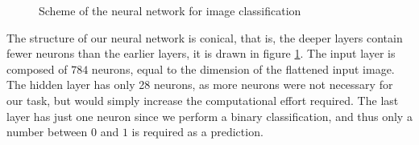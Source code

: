 \documentclass[a4paper,11pt,oneside]{book}
\def\nstyle{int(\lay<\Nnodlen?min(2,\lay):3)} %
\begin{document}
\begin{figure}
\centering
{}
\caption{Scheme of the neural network for image classification}
\label{NN_scheme}
\end{figure}


The structure of our neural network is conical, that is, the deeper layers contain fewer neurons than the earlier layers, it is drawn in figure \ref{NN_scheme}. 
The input layer is composed of $784$ neurons, equal to the dimension of the flattened input image. The hidden layer has only 28 neurons, as more neurons were not necessary for our task, but would simply increase the computational effort required. The last layer has just one neuron since we perform a binary classification, and thus only a number between $0$ and $1$ is required as a prediction.
\end{document}
